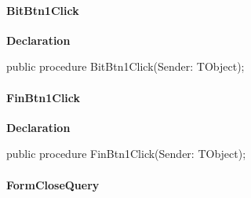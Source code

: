 \documentclass{report}
\newif\ifpdf
\begin{document}
\paragraph*{BitBtn1Click}\hspace*{\fill}

\label{dgunit.TDGForm-BitBtn1Click}
\begin{list}{}{
\setlength{\itemindent}{0cm}
\setlength{\listparindent}{0cm}
\setlength{\leftmargin}{\evensidemargin}
\addtolength{\leftmargin}{\tmplength}
\settowidth{\labelsep}{X}
\addtolength{\leftmargin}{\labelsep}
\setlength{\labelwidth}{\tmplength}
}
\item[\textbf{Declaration}\hfill]
\ifpdf
\begin{flushleft}
\fi
\begin{ttfamily}
public procedure BitBtn1Click(Sender: TObject);\end{ttfamily}

\ifpdf
\end{flushleft}
\fi

\end{list}
\paragraph*{FinBtn1Click}\hspace*{\fill}

\label{dgunit.TDGForm-FinBtn1Click}
\begin{list}{}{
\setlength{\itemindent}{0cm}
\setlength{\listparindent}{0cm}
\setlength{\leftmargin}{\evensidemargin}
\addtolength{\leftmargin}{\tmplength}
\settowidth{\labelsep}{X}
\addtolength{\leftmargin}{\labelsep}
\setlength{\labelwidth}{\tmplength}
}
\item[\textbf{Declaration}\hfill]
\ifpdf
\begin{flushleft}
\fi
\begin{ttfamily}
public procedure FinBtn1Click(Sender: TObject);\end{ttfamily}

\ifpdf
\end{flushleft}
\fi

\end{list}
\paragraph*{FormCloseQuery}\hspace*{\fill}
\end{document}
